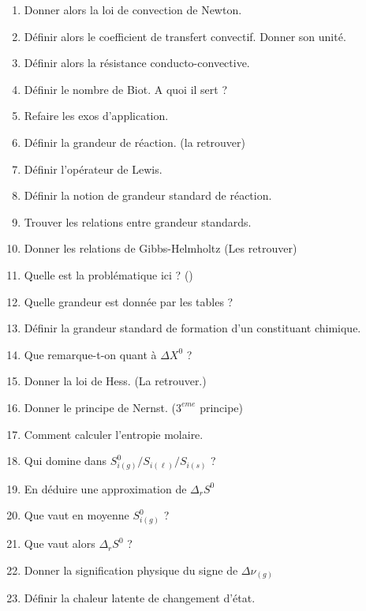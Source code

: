 \documentclass[a4paper, 11pt, hidelinks]{article}
\newcommand{\rb}[1]{\Romanbar{#1}}
\begin{document}
\begin{enumerate}
    \item Donner alors la loi de convection de Newton. \cite{Chapitre20}
    \item Définir alors le coefficient de transfert convectif. Donner son unité. \cite{Chapitre20}
    \item Définir alors la résistance conducto-convective. \cite{Chapitre20}
    \item Définir le nombre de Biot. A quoi il sert ? \cite{Chapitre20}
    \item Refaire les exos d'application. \cite{Chapitre20}
    \item Définir la grandeur de réaction. (la retrouver) \cite{Chapitre2bis}
    \item Définir l'opérateur de Lewis. \cite{Chapitre2bis}
    \item Définir la notion de grandeur standard de réaction. \cite{Chapitre2bis}
    \item Trouver les relations entre grandeur standards. \cite{Chapitre2bis}
    \item Donner les relations de Gibbs-Helmholtz (Les retrouver) \cite{Chapitre2bis}
    \item Quelle est la problématique ici ? (\rb{2}) \cite{Chapitre2bis}
    \item Quelle grandeur est donnée par les tables ? \cite{Chapitre2bis}
    \item Définir la grandeur standard de formation d'un constituant chimique. \cite{Chapitre2bis}
    \item Que remarque-t-on quant à $\Delta X^0$ ? \cite{Chapitre2bis}
    \item Donner la loi de Hess. (La retrouver.) \cite{Chapitre2bis}
    \item Donner le principe de Nernst. ($3^{eme}$ principe) \cite{Chapitre2bis}
    \item Comment calculer l'entropie molaire. \cite{Chapitre2bis}
    \item Qui domine dans $S_{i(g)}^0 / S_{i(\ell)} / S_{i(s)}$ ? \cite{Chapitre2bis}
    \item En déduire une approximation de $\Delta_r S^0$ \cite{Chapitre2bis}
    \item Que vaut en moyenne $S_{i(g)}^0$ ? \cite{Chapitre2bis}
    \item Que vaut alors $\Delta_r S^0$ ? \cite{Chapitre2bis}
    \item Donner la signification physique du signe de $\Delta \nu_{(g)}$ \cite{Chapitre2bis}
    \item Définir la chaleur latente de changement d'état. \cite{Chapitre2bis}

\end{enumerate}
\end{document}
